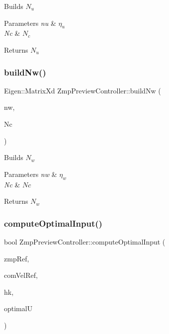 Builds $N_u$


\begin{DoxyParams}{Parameters}
{\em nu} & $\eta_u$ \\
\hline
{\em Nc} & $N_c$\\
\hline
\end{DoxyParams}
\begin{DoxyReturn}{Returns}
$N_u$ 
\end{DoxyReturn}
\hypertarget{classZmpPreviewController_a96bed83f8441cfbd6d6fbff54c5b530d}{}\label{classZmpPreviewController_a96bed83f8441cfbd6d6fbff54c5b530d} 
\subsubsection{\texorpdfstring{build\+Nw()}{buildNw()}}
{\footnotesize\ttfamily Eigen\+::\+Matrix\+Xd Zmp\+Preview\+Controller\+::build\+Nw (\begin{DoxyParamCaption}\item[{const double}]{nw,  }\item[{const int}]{Nc }\end{DoxyParamCaption})}

Builds $N_w$


\begin{DoxyParams}{Parameters}
{\em nw} & $\eta_w$ \\
\hline
{\em Nc} & $Nc$\\
\hline
\end{DoxyParams}
\begin{DoxyReturn}{Returns}
$N_w$ 
\end{DoxyReturn}
\hypertarget{classZmpPreviewController_a6e60eaa9ec24031a4acd10c9433a7bd0}{}\label{classZmpPreviewController_a6e60eaa9ec24031a4acd10c9433a7bd0} 
\subsubsection{\texorpdfstring{compute\+Optimal\+Input()}{computeOptimalInput()}}
{\footnotesize\ttfamily bool Zmp\+Preview\+Controller\+::compute\+Optimal\+Input (\begin{DoxyParamCaption}\item[{Eigen\+::\+Vector\+Xd}]{zmp\+Ref,  }\item[{Eigen\+::\+Vector\+Xd}]{com\+Vel\+Ref,  }\item[{Eigen\+::\+Vector2d}]{hk,  }\item[{Eigen\+::\+Vector\+Xd \&}]{optimalU }\end{DoxyParamCaption})}

